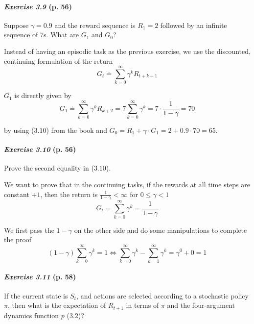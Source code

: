\documentclass[10pt,a4paper]{article}
\begin{document}
\paragraph{\textit{Exercise 3.9} (p. 56)} Suppose $\gamma = 0.9$ and the reward sequence is $R_1 = 2$ followed by an infinite sequence of $7$s. What are $G_1$ and $G_0$?

\bigskip
Instead of having an episodic task as the previous exercise, we use the discounted, continuing formulation of the return
\begin{equation}
G_t \doteq \sum_{k=0}^\infty \gamma^k R_{t+k+1}
\end{equation}

$G_1$ is directly given by
\begin{equation}
G_1 \doteq \sum_{k=0}^\infty \gamma^k R_{k+2} = 7 \sum_{k=0}^\infty \gamma^k = 7 \cdot \frac{1}{1-\gamma} = 70
\end{equation}

by using ($3.10$) from the book and $G_0 = R_1 + \gamma \cdot G_1 = 2 + 0.9 \cdot 70 = 65$.


\paragraph{\textit{Exercise 3.10} (p. 56)} Prove the second equality in ($3.10$).

\bigskip
We want to prove that in the continuing tasks, if the rewards at all time steps are constant $+1$, then the return is $\frac{1}{1-\gamma} < \infty$ for $0 \leq \gamma < 1$
\begin{equation}
G_t =\sum_{k=0}^\infty \gamma^k = \frac{1}{1-\gamma}
\end{equation}

We first pass the $1-\gamma$ on the other side and do some manipulations to complete the proof
\begin{equation}
(1-\gamma) \sum_{k=0}^\infty \gamma^k = 1 \iff \sum_{k=0}^\infty \gamma^k - \sum_{k=1}^\infty \gamma^{k} = \gamma^0 + 0 = 1
\end{equation}

\paragraph{\textit{Exercise 3.11} (p. 58)} If the current state is $S_t$, and actions are selected according to a stochastic
policy $\pi$, then what is the expectation of $R_{t+1}$ in terms of $\pi$ and the four-argument dynamics function $p$ ($3.2$)?
\end{document}
